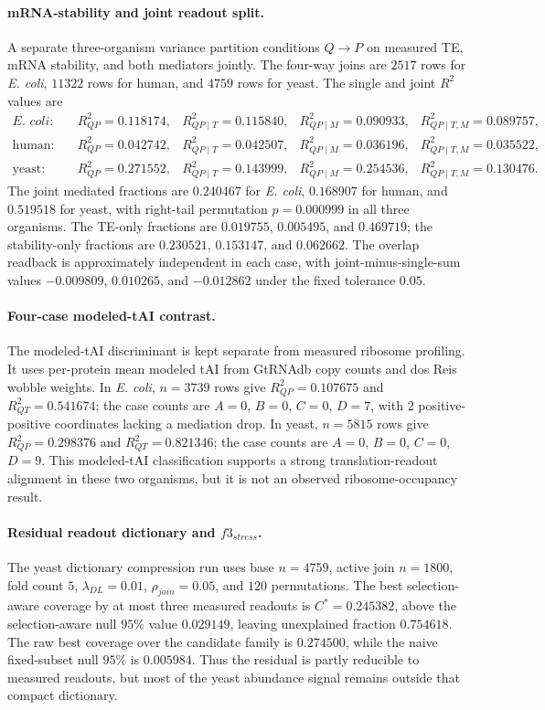 \paragraph{mRNA-stability and joint readout split.}
A separate three-organism variance partition conditions $Q\to P$ on measured TE, mRNA stability, and both mediators jointly.  The four-way joins are $2517$ rows for \emph{E. coli}, $11322$ rows for human, and $4759$ rows for yeast.  The single and joint $R^2$ values are
$$
\begin{aligned}
\textit{E. coli}:\quad &R^2_{QP}=0.118174, &R^2_{QP\mid T}=0.115840, &R^2_{QP\mid M}=0.090933, &R^2_{QP\mid T,M}=0.089757,\\
\text{human}:\quad &R^2_{QP}=0.042742, &R^2_{QP\mid T}=0.042507, &R^2_{QP\mid M}=0.036196, &R^2_{QP\mid T,M}=0.035522,\\
\text{yeast}:\quad &R^2_{QP}=0.271552, &R^2_{QP\mid T}=0.143999, &R^2_{QP\mid M}=0.254536, &R^2_{QP\mid T,M}=0.130476.
\end{aligned}
$$
The joint mediated fractions are $0.240467$ for \emph{E. coli}, $0.168907$ for human, and $0.519518$ for yeast, with right-tail permutation $p=0.000999$ in all three organisms.  The TE-only fractions are $0.019755$, $0.005495$, and $0.469719$; the stability-only fractions are $0.230521$, $0.153147$, and $0.062662$.  The overlap readback is approximately independent in each case, with joint-minus-single-sum values $-0.009809$, $0.010265$, and $-0.012862$ under the fixed tolerance $0.05$.

\paragraph{Four-case modeled-tAI contrast.}
The modeled-tAI discriminant is kept separate from measured ribosome profiling.  It uses per-protein mean modeled tAI from GtRNAdb copy counts and dos Reis wobble weights.  In \emph{E. coli}, $n=3739$ rows give $R^2_{QP}=0.107675$ and $R^2_{QT}=0.541674$; the case counts are $A=0$, $B=0$, $C=0$, $D=7$, with $2$ positive-positive coordinates lacking a mediation drop.  In yeast, $n=5815$ rows give $R^2_{QP}=0.298376$ and $R^2_{QT}=0.821346$; the case counts are $A=0$, $B=0$, $C=0$, $D=9$.  This modeled-tAI classification supports a strong translation-readout alignment in these two organisms, but it is not an observed ribosome-occupancy result.

\paragraph{Residual readout dictionary and $f3_{stress}$.}
The yeast dictionary compression run uses base $n=4759$, active join $n=1800$, fold count $5$, $\lambda_{DL}=0.01$, $\rho_{join}=0.05$, and $120$ permutations.  The best selection-aware coverage by at most three measured readouts is $C^*=0.245382$, above the selection-aware null $95\%$ value $0.029149$, leaving unexplained fraction $0.754618$.  The raw best coverage over the candidate family is $0.274500$, while the naive fixed-subset null $95\%$ is $0.005984$.  Thus the residual is partly reducible to measured readouts, but most of the yeast abundance signal remains outside that compact dictionary.

